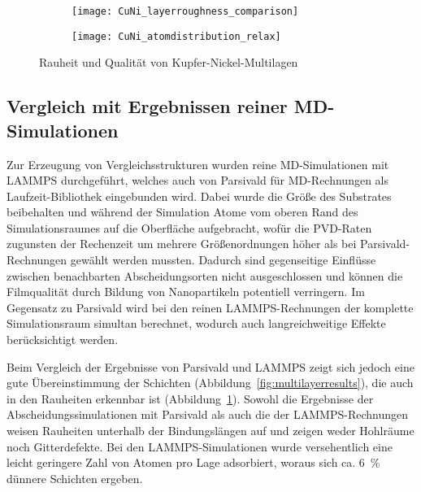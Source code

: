 \begin{figure}[bp]
  \captionsetup[subfigure]{singlelinecheck=false}
  \def\subfigwidth{7cm}
  \begin{subfigure}[t]{\subfigwidth}
    \texttt{[image: CuNi\_layerroughness\_comparison]}
    \label{fig:multilayerplots-a}
  \end{subfigure}
  \hfill
  \begin{subfigure}[t]{\subfigwidth}
    \texttt{[image: CuNi\_atomdistribution\_relax]}
    \label{fig:multilayerplots-b}
  \end{subfigure}
  \caption[Rauheit und Qualität von Kupfer-Nickel-Multilagen]{
    Rauheit und Qualität von Kupfer-Nickel-Multilagen
  }
  \label{fig:multilayerplots}
\end{figure}

\subsection{Vergleich mit Ergebnissen reiner MD-Simulationen}

Zur Erzeugung von Vergleichsstrukturen wurden reine MD-Simulationen mit LAMMPS durchgeführt, welches auch von Parsivald für MD-Rechnungen als Laufzeit-Bibliothek eingebunden wird.
Dabei wurde die Größe des Substrates beibehalten und während der Simulation Atome vom oberen Rand des Simulationsraumes auf die Oberfläche aufgebracht, wofür die PVD-Raten zugunsten der Rechenzeit um mehrere Größenordnungen höher als bei Parsivald-Rechnungen gewählt werden mussten.
Dadurch sind gegenseitige Einflüsse zwischen benachbarten Abscheidungsorten nicht ausgeschlossen und können die Filmqualität durch Bildung von Nanopartikeln potentiell verringern.
Im Gegensatz zu Parsivald wird bei den reinen LAMMPS-Rechnungen der komplette Simulationsraum simultan berechnet, wodurch auch langreichweitige Effekte berücksichtigt werden.

Beim Vergleich der Ergebnisse von Parsivald und LAMMPS zeigt sich jedoch eine gute Übereinstimmung der Schichten (Abbildung~\ref{fig:multilayerresults}), die auch in den Rauheiten erkennbar ist (Abbildung~\ref{fig:multilayerplots-a}).
Sowohl die Ergebnisse der Abscheidungssimulationen mit Parsivald als auch die der LAMMPS-Rechnungen weisen Rauheiten unterhalb der Bindungslängen auf und zeigen weder Hohlräume noch Gitterdefekte.
Bei den LAMMPS-Simulationen wurde versehentlich eine leicht geringere Zahl von Atomen pro Lage adsorbiert, woraus sich ca. \SI{6}{\percent} dünnere Schichten ergeben.

